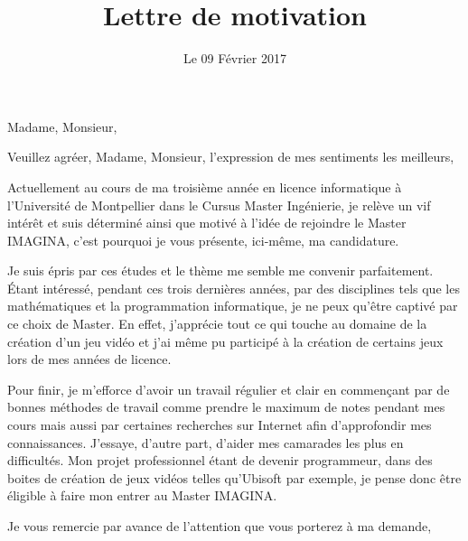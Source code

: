 \documentclass[11pt,a4paper,sans]{moderncv}
\title{Lettre de motivation}
\begin{document}
\date{Le 09 Février 2017}
\opening{Madame, Monsieur,}
\closing{Veuillez agréer, Madame, Monsieur, l'expression de mes sentiments les meilleurs,}

\makelettertitle

Actuellement au cours de ma troisième année en licence informatique à l'Université de Montpellier dans le Cursus Master Ingénierie, je relève un vif intérêt et suis déterminé ainsi que motivé à l'idée de rejoindre le Master IMAGINA, c'est pourquoi je vous présente, ici-même, ma candidature.

Je suis épris par ces études et le thème me semble me convenir parfaitement. Étant intéressé, pendant ces trois dernières années, par des disciplines tels que les mathématiques et la programmation informatique, je ne peux qu'être captivé par ce choix de Master. En effet, j’apprécie tout ce qui touche au domaine de la création d'un jeu vidéo et j'ai même pu participé à la création de certains jeux lors de mes années de licence.

Pour finir, je m'efforce d'avoir un travail régulier et clair en commençant par de bonnes méthodes de travail comme prendre le maximum de notes pendant mes cours mais aussi par certaines recherches sur Internet afin d’approfondir mes connaissances. J'essaye, d'autre part, d'aider mes camarades les plus en difficultés. Mon projet professionnel étant de devenir programmeur, dans des boites de création de jeux vidéos telles qu'Ubisoft par exemple, je pense donc être éligible à faire mon entrer au Master IMAGINA.

Je vous remercie par avance de l'attention que vous porterez à ma demande,

\makeletterclosing
\end{document}
